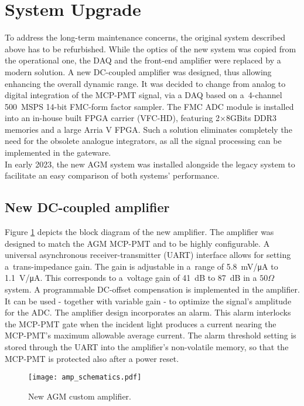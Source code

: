 \section{System Upgrade}
To address the long-term maintenance concerns, the original system described above has to be refurbished. 
%
While the optics of the new system was copied from the operational one, the DAQ and the front-end amplifier were replaced by a modern solution.
%
A new DC-coupled amplifier was designed, thus allowing enhancing the overall dynamic range. 
%
It was decided to change from analog to digital integration of the MCP-PMT signal, via a DAQ based on  a~4-channel \SI{500}{MSPS} 14-bit FMC-form factor sampler.
%
The FMC ADC module is installed into an in-house built FPGA carrier (VFC-HD), featuring 2$\times 8$GBits DDR3 memories and a large Arria V FPGA.
%
Such a solution eliminates completely the need for the obsolete analogue integrators, as all the signal processing can be implemented in the gateware.
\\
In early 2023, the new AGM system was installed alongside the legacy system to facilitate an easy comparison of both systems' performance.

\subsection{New DC-coupled amplifier}

Figure \ref{fig:amp_schematics} depicts the block diagram of the new amplifier.
%
The amplifier was designed to match the AGM MCP-PMT and to be  highly configurable.
%
A universal asynchronous receiver-transmitter (UART) interface allows for setting a~trans-impedance gain.
%
The gain is adjustable in a~range of \SI{5.8}{mV/\micro A} to \SI{1.1}{V/\micro A}.
%
This corresponds to a~voltage gain of \SI{41}{dB} to \SI{87}{dB} in a $50\Omega$ system.
%
A programmable DC-offset compensation is implemented in the amplifier.
%
It can be used - together with variable gain - to optimize the signal's amplitude for the ADC.
%
The amplifier design incorporates an alarm. This alarm interlocks the MCP-PMT gate when the incident light produces a current nearing the MCP-PMT's maximum allowable average current.
%
The alarm threshold setting is stored through the UART into the amplifier's non-volatile memory, so that 
the MCP-PMT is protected also after a power reset. %
%
%
\begin{figure}[!tbh]
    \centering
    \texttt{[image: amp\_schematics.pdf]}
    \caption{New AGM custom amplifier.}
    \label{fig:amp_schematics}
\end{figure}
%
